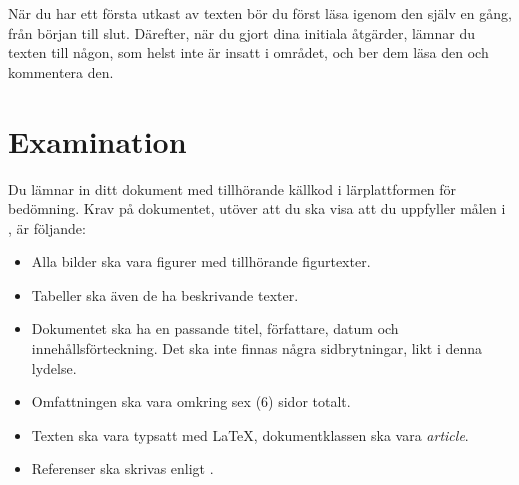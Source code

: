 \documentclass[a4paper]{miunasgn}
\begin{document}
När du har ett första utkast av texten bör du först läsa igenom den själv en 
gång, från början till slut.
Därefter, när du gjort dina initiala åtgärder, lämnar du texten till någon, som 
helst inte är insatt i området, och ber dem läsa den och kommentera den.


\section{Examination}
\label{sec:Examination}
Du lämnar in ditt dokument med tillhörande källkod i lärplattformen för 
bedömning.
Krav på dokumentet, utöver att du ska visa att du uppfyller målen 
i , är följande:
\begin{itemize}
  \item Alla bilder ska vara figurer med tillhörande figurtexter.
  \item Tabeller ska även de ha beskrivande texter.
  \item Dokumentet ska ha en passande titel, författare, datum och 
    innehållsförteckning.
    Det ska inte finnas några sidbrytningar, likt i denna lydelse.
  \item Omfattningen ska vara omkring sex (6) sidor totalt.
  \item Texten ska vara typsatt med LaTeX, dokumentklassen ska vara 
    \emph{article}.
  \item Referenser ska skrivas enligt  
    \cite{IEEEciteation}.
\end{itemize}


\printbibliography
\end{document}
